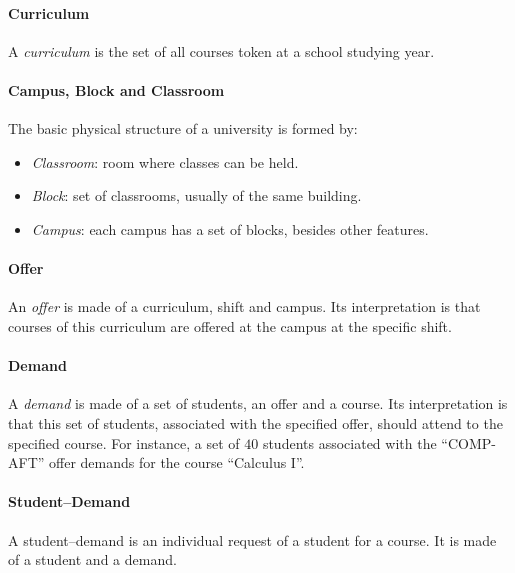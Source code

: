 \paragraph{Curriculum}
\label{defcurric}

A \textit{curriculum} is the set of all courses token at a school studying year.


\paragraph{Campus, Block and Classroom}
\label{defclassroom}

The basic physical structure of a university is formed by:
\begin{itemize}
\item \textit{Classroom}: room where classes can be held.
\item \textit{Block}: set of classrooms, usually of the same building.
\item \textit{Campus}: each campus has a set of blocks, besides other features.
\end{itemize}


\paragraph{Offer}
\label{defoffer}
 
An \textit{offer} is made of a curriculum, shift and campus. Its interpretation is that courses of this curriculum are offered at the campus at the specific shift.


\paragraph{Demand}
 \label{defdem}

A \textit{demand} is made of a set of students, an offer and a course. Its interpretation is that this set of students, associated with the specified offer, should attend to the specified course.
For instance, a set of $40$ students associated with the ``COMP-AFT'' offer demands for the course ``Calculus I''.


\paragraph{Student--Demand}
\label{defstdem}

A student--demand is an individual request of a student for a course. It is made of a student and a demand.


